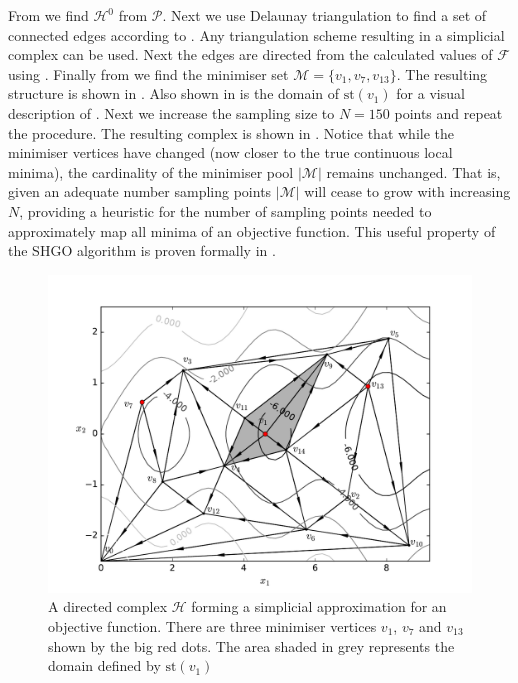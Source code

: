 From  we find $\mathcal{H}^0$ from $\mathcal{P}$. Next we use Delaunay triangulation to find a set of connected edges according to . Any triangulation scheme resulting in a simplicial complex can be used. Next the edges are directed from the calculated values of $\mathcal{F}$ using . Finally from  we find the minimiser set $\mathcal{M} = \{v_{1}, v_{7}, v_{13}\}$. The resulting structure is shown in . Also shown in  is the domain of $\textrm{st}\left( v_1 \right)$ for a visual description of . Next we increase the sampling size to $N = 150$ points and repeat the procedure. The resulting complex is shown in . Notice that while the minimiser vertices have changed (now closer to the true continuous local minima), the cardinality of the minimiser pool $|\mathcal{M}|$ remains unchanged. That is, given an adequate number sampling points $|\mathcal{M}|$ will cease to grow with increasing $N$, providing a heuristic for the number of sampling points needed to approximately map all minima of an objective function. This useful property of the SHGO algorithm is proven formally in . 

\begin{figure} 
\centerline{\includegraphics[scale=1.0]{./Fig7.pdf}}
{\caption{A directed complex $\mathcal{H}$ forming a simplicial approximation for an objective function. There are three minimiser vertices $v_1$, $v_7$ and $v_{13}$ shown by the big red dots. The area shaded in grey represents the domain defined by $\textrm{st}\left( v_1 \right)$} \label{fig:alp5}}
\end{figure}

